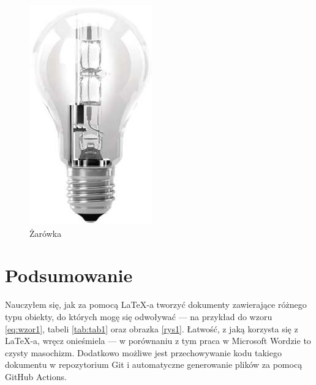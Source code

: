 \documentclass[12pt,a4paper]{article}
\begin{document}
\begin{figure}
\centerline{
	\includegraphics[angle=30]{Rysunek2.jpg}
}
\caption{Żarówka}
\label{rys3}
\end{figure}

\clearpage
\section{Podsumowanie}

Nauczyłem się, jak za pomocą LaTeX-a tworzyć dokumenty zawierające różnego typu obiekty, do których mogę się odwoływać — na przykład do wzoru \ref{eq:wzor1}, tabeli \ref{tab:tab1} oraz obrazka \ref{rys1}.
Łatwość, z jaką korzysta się z LaTeX-a, wręcz onieśmiela — w porównaniu z tym praca w Microsoft Wordzie to czysty masochizm.
Dodatkowo możliwe jest przechowywanie kodu takiego dokumentu w repozytorium Git i automatyczne generowanie plików za pomocą GitHub Actions.
\end{document}

